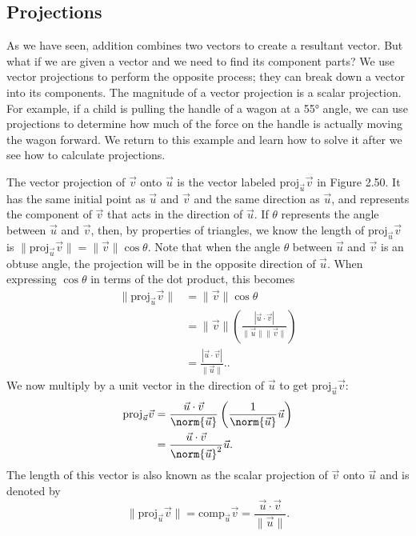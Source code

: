 \documentclass{report}
\begin{document}
    \subsection{Projections}
    \bigbreak \noindent 
    As we have seen, addition combines two vectors to create a resultant vector. But what if we are given a vector and we need to find its component parts? We use vector projections to perform the opposite process; they can break down a vector into its components. The magnitude of a vector projection is a scalar projection. For example, if a child is pulling the handle of a wagon at a 55° angle, we can use projections to determine how much of the force on the handle is actually moving the wagon forward. We return to this example and learn how to solve it after we see how to calculate projections.
    \bigbreak \noindent 
    \bigbreak \noindent 
    \pagebreak 
    \begin{dfn}
        The vector projection of $\vec{v}$ onto $\vec{u}$ is the vector labeled $\text{proj}_{\vec{u}}\vec{v}$ in Figure 2.50. It has the same initial point as $\vec{u}$ and $\vec{v}$ and the same direction as $\vec{u}$, and represents the component of $\vec{v}$ that acts in the direction of $\vec{u}$. If $\theta$ represents the angle between $\vec{u}$ and $\vec{v}$, then, by properties of triangles, we know the length of $\text{proj}_{\vec{u}}\vec{v}$ is $\|\text{proj}_{\vec{u}}\vec{v}\| = \|\vec{v}\|\cos\theta$. Note that when the angle $\theta$ between $\vec{u}$ and $\vec{v}$ is an obtuse angle, the projection will be in the opposite direction of $\vec{u}$. When expressing $\cos\theta$ in terms of the dot product, this becomes
        \begin{align*}
            \|\text{proj}_{\vec{u}}\vec{v}\| &= \|\vec{v}\|\cos\theta \\
            &= \|\vec{v}\|\left(\frac{|\vec{u} \cdot \vec{v}|}{\|\vec{u}\|\|\vec{v}\|}\right) \\
            &= \frac{|\vec{u} \cdot \vec{v}|}{\|\vec{u}\|}.
        .\end{align*}
        We now multiply by a unit vector in the direction of $\vec{u}$ to get $\text{proj}_{\vec{u}}\vec{v}$:
        \begin{align*}
            \text{proj}_{\vec{u}}\vec{v} &=\frac{\vec{u}\cdot \vec{v}}{\norm{\vec{u}}}\left(\frac{1}{\norm{\vec{u}}}\vec{u}\right) \\
                                         &=\frac{\vec{u}\cdot \vec{v}}{\norm{\vec{u}}^{2}}\vec{u}
        .\end{align*}
        The length of this vector is also known as the scalar projection of $\vec{v}$ onto $\vec{u}$ and is denoted by
        \[
            \|\text{proj}_{\vec{u}}\vec{v}\| = \text{comp}_{\vec{u}}\vec{v} = \frac{\vec{u} \cdot \vec{v}}{\|\vec{u}\|}.
        \]
    \end{dfn}
    \bigbreak \noindent 
\end{document}
